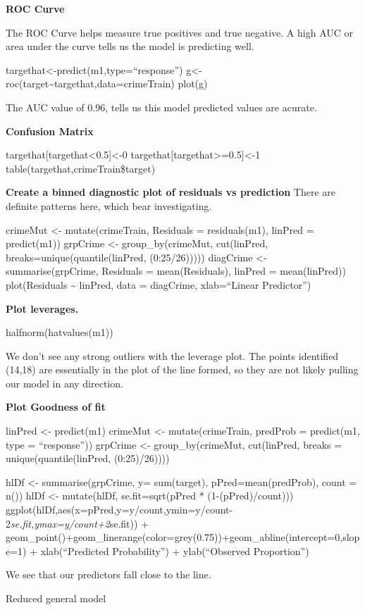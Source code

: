 \documentclass[
]{article}
\begin{document}
\textbf{ROC Curve}

The ROC Curve helps measure true positives and true negative. A high AUC
or area under the curve tells us the model is predicting well.

targethat\textless-predict(m1,type=``response'')
g\textless-roc(target\textasciitilde targethat,data=crimeTrain) plot(g)

The AUC value of 0.96, tells us this model predicted values are acurate.

\textbf{Confusion Matrix}

targethat{[}targethat\textless0.5{]}\textless-0
targethat{[}targethat\textgreater=0.5{]}\textless-1
table(targethat,crimeTrain\$target)

\textbf{Create a binned diagnostic plot of residuals vs prediction}
There are definite patterns here, which bear investigating.

crimeMut \textless- mutate(crimeTrain, Residuals = residuals(m1),
linPred = predict(m1)) grpCrime \textless- group\_by(crimeMut,
cut(linPred, breaks=unique(quantile(linPred, (0:25/26))))) diagCrime
\textless- summarise(grpCrime, Residuals = mean(Residuals), linPred =
mean(linPred)) plot(Residuals \textasciitilde{} linPred, data =
diagCrime, xlab=``Linear Predictor'')

\textbf{Plot leverages.}

halfnorm(hatvalues(m1))

We don't see any strong outliers with the leverage plot. The points
identified (14,18) are essentially in the plot of the line formed, so
they are not likely pulling our model in any direction.

\textbf{Plot Goodness of fit}

linPred \textless- predict(m1) crimeMut \textless- mutate(crimeTrain,
predProb = predict(m1, type = ``response'')) grpCrime \textless-
group\_by(crimeMut, cut(linPred, breaks = unique(quantile(linPred,
(0:25)/26))))

hlDf \textless- summarise(grpCrime, y= sum(target),
pPred=mean(predProb), count = n()) hlDf \textless- mutate(hlDf,
se.fit=sqrt(pPred * (1-(pPred)/count)))
ggplot(hlDf,aes(x=pPred,y=y/count,ymin=y/count-2\emph{se.fit,ymax=y/count+2}se.fit))
+
geom\_point()+geom\_linerange(color=grey(0.75))+geom\_abline(intercept=0,slope=1)
+ xlab(``Predicted Probability'') + ylab(``Observed Proportion'')

We see that our predictors fall close to the line.

Reduced general model
\end{document}
